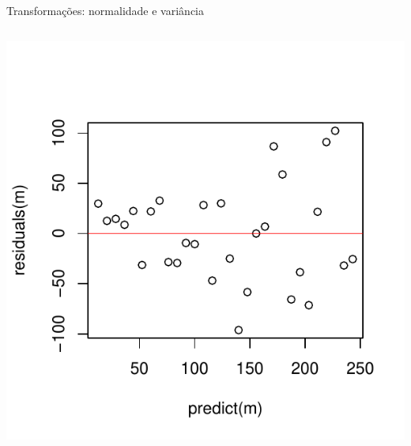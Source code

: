 \documentclass{beamer}\usepackage[]{graphicx}\usepackage[]{color}
\newenvironment{knitrout}{}{} %
\renewenvironment{knitrout}{\setlength{\topsep}{0mm}}{}
\begin{document}
\begin{frame}{Transformações: normalidade e variância}
\begin{columns}[c]
\begin{knitrout}\scriptsize
{}\color{fgcolor}
\includegraphics[width=0.9\linewidth]{figure/t2-1} 

\end{knitrout}

\end{columns}

\end{frame}
\end{document}
